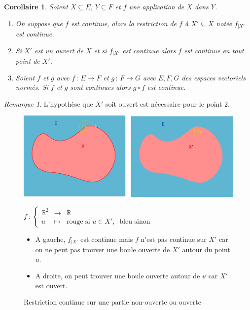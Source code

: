 \documentclass[]{article}
\newtheorem{mycor}{Corollaire}
\theoremstyle{remark}
\newtheorem{myrem}{Remarque}
\theoremstyle{definition}
\newcommand{\func}[5]{
#1 \, : \, \left\{ \begin{array}{lcl}
	#2 & \longrightarrow & #3 \\
	#4 & \longmapsto & #5
\end{array}
\right.
}
\newcommand{\funcshort}[3]{
#1 \, : \, #2 \longrightarrow #3
}
\begin{document}
\begin{mycor}
	Soient $X \subseteq E$, $Y \subseteq F$ et $f$ une application de $X$ dans $Y$.
	\begin{enumerate}
		\item On suppose que $f$ est continue, alors la restriction de $f$ à $X' \subseteq X$ notée $f_{|X'}$ est continue.
		
		\item Si $X'$ est un ouvert de $X$ et si $f_{|X'}$ est continue alors $f$ est continue en tout point de $X'$.
		
		\item Soient $f$ et $g$  avec $\funcshort{f}{E}{F}$ et $\funcshort{g}{F}{G}$ avec $E, F, G$ des espaces vectoriels normés. Si $f$ et $g$ sont continues alors $g \circ f$ est continue.
	\end{enumerate}
\end{mycor}

\newpage

\begin{myrem}
	L'hypothèse que $X'$ soit ouvert est nécessaire pour le point 2.
	\begin{figure}[h!]
		\centering
		\includegraphics[width=550pt]{Application_continue}
		\caption{Restriction continue sur une partie non-ouverte ou ouverte}
		
		$\func{f}{\mathbb{R}^2}{\mathbb{R}}{u}{\text{rouge si } u \in X', ~ \text{ bleu sinon}}$
		
		\begin{itemize}
		\item A gauche, $f_{|X'}$ est continue mais $f$ n'est pas continue sur $X'$ car on ne peut pas trouver une boule ouverte de $X'$ autour du point $u$.
		
		\item A droite, on peut trouver une boule ouverte autour de $u$ car $X'$ est ouvert.
		\end{itemize}
	\end{figure}
\end{myrem}
\end{document}
